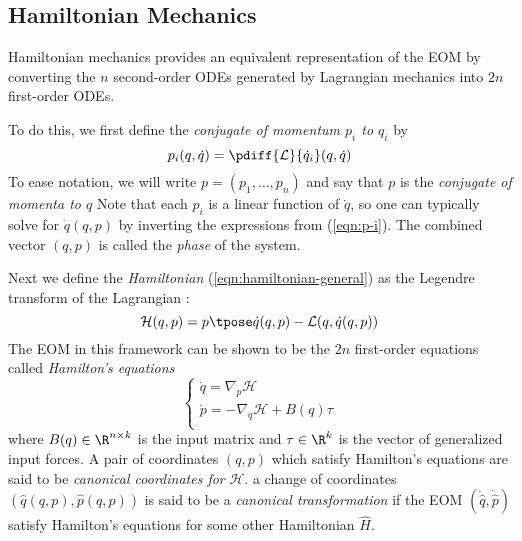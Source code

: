 \subsection{Hamiltonian Mechanics}
Hamiltonian mechanics provides an equivalent representation of the EOM
by converting the \(n\) second-order ODEs generated by Lagrangian mechanics into
\(2n\) first-order ODEs.

To do this, we first define the \textit{conjugate of momentum \(p_i\) to \(q_i\)} by
\begin{equation}\label{eqn:p-i}
    p_i(q,\dot{q}) = \pdiff{\mathcal{L}}{\dot{q}_i}(q,\dot{q})
\end{equation}
To ease notation, we will write \(p = (p_1, \ldots, p_n)\) and say that \(p\) is
the \textit{conjugate of momenta to \(q\)} Note that each \(p_i\) is a linear
function of \(\dot{q}\), so one can typically solve for \(\dot{q}(q,p)\) by
inverting the expressions from (\ref{eqn:p-i}). The combined vector \((q,p)\) is
called the \textit{phase} of the system.

Next we define the \textit{Hamiltonian} (\ref{eqn:hamiltonian-general}) 
as the Legendre transform of the Lagrangian \cite{landau_mechanics}:
\begin{equation}\label{eqn:hamiltonian-general}
    \mathcal{H}(q,p) = p\tpose \dot{q}(q,p) - \mathcal{L}(q,\dot{q}(q,p))
\end{equation}
The EOM in this framework can be shown to be the \(2n\)
first-order equations called \textit{Hamilton's equations}
\begin{equation}\label{eqn:hamiltons-eqns}
    \begin{cases}
        \dot{q} = \nabla_p\mathcal{H} \\
        \dot{p} = -\nabla_q\mathcal{H} + B(q)\tau \\
    \end{cases}
\end{equation}
where \(B(q) \in \R^{n\times k}\) is the input matrix and 
\(\tau \in \R^k\) is the vector of generalized input forces. A pair of
coordinates \((q,p)\) which satisfy Hamilton's equations are said to be 
\textit{canonical coordinates for} \(\mathcal{H}\). a change of coordinates
\((\hat{q}(q,p),\hat{p}(q,p))\) is said to be a \textit{canonical
transformation} if the EOM \((\dot{\hat{q}},\dot{\hat{p}})\) satisfy Hamilton's
equations for some other Hamiltonian \(\hat{H}\).

